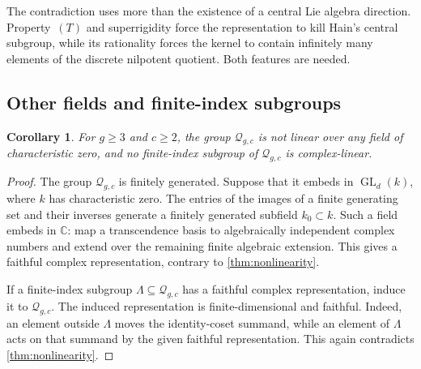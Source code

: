 \documentclass[11pt,a4paper]{article}
\newtheorem{corollary}[theorem]{Corollary}
\theoremstyle{definition}
\newcommand{\C}{\mathbb C}
\newcommand{\GL}{\operatorname{GL}}
\newcommand{\rt}{(T)}
\begin{document}
The contradiction uses more than the existence of a central Lie
algebra direction. Property~\(\rt\) and superrigidity force the
representation to kill Hain's central subgroup, while its rationality
forces the kernel to contain infinitely many elements of the discrete
nilpotent quotient. Both features are needed.

\subsection{Other fields and finite-index subgroups}

\begin{corollary}\label{cor:charzero}
For \(g\ge3\) and \(c\ge2\), the group \(\mathcal{Q}_{g,c}\) is not
linear over any field of characteristic zero, and no finite-index
subgroup of \(\mathcal{Q}_{g,c}\) is complex-linear.
\end{corollary}
\begin{proof}
The group \(\mathcal{Q}_{g,c}\) is finitely generated. Suppose that it embeds
in \(\GL_d(k)\), where \(k\) has characteristic zero. The entries
of the images of a finite generating set and their inverses generate
a finitely generated subfield \(k_0\subset k\). Such a field embeds
in \(\C\): map a transcendence basis to algebraically independent
complex numbers and extend over the remaining finite algebraic
extension. This gives a faithful complex representation, contrary
to \cref{thm:nonlinearity}.

If a finite-index subgroup \(\Lambda\subseteq \mathcal{Q}_{g,c}\) has a faithful
complex representation, induce it to \(\mathcal{Q}_{g,c}\). The induced
representation is finite-dimensional and faithful. Indeed, an element
outside \(\Lambda\) moves the identity-coset summand, while an
element of \(\Lambda\) acts on that summand by the given faithful
representation. This again contradicts \cref{thm:nonlinearity}.
\end{proof}
\end{document}
